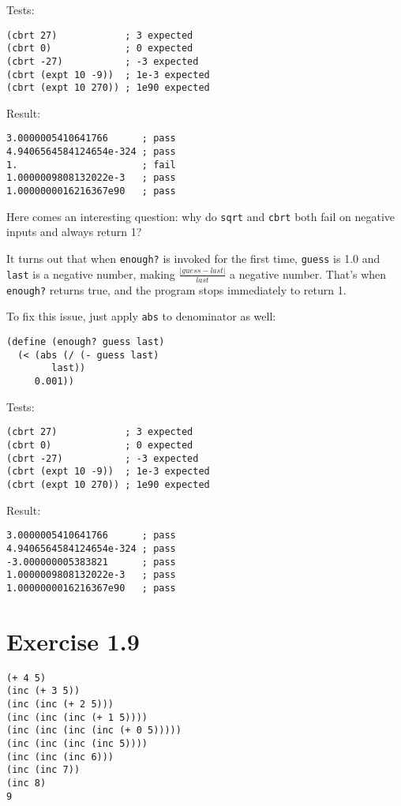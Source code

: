 \documentclass[../main.tex]{subfiles}
\begin{document}
Tests:

\begin{lstlisting}
(cbrt 27)            ; 3 expected
(cbrt 0)             ; 0 expected
(cbrt -27)           ; -3 expected
(cbrt (expt 10 -9))  ; 1e-3 expected
(cbrt (expt 10 270)) ; 1e90 expected
\end{lstlisting}

Result:

\begin{lstlisting}
3.0000005410641766      ; pass
4.9406564584124654e-324 ; pass
1.                      ; fail
1.0000009808132022e-3   ; pass
1.0000000016216367e90   ; pass
\end{lstlisting}

Here comes an interesting question: why do
 \lstinline{sqrt} and \lstinline{cbrt}
 both fail on negative inputs and always
 return 1?

It turns out that when \lstinline{enough?} is invoked
 for the first time, \lstinline{guess} is 1.0 and
 \lstinline{last} is a negative number, making
 $\frac{|guess-last|}{last}$ a negative number. That's
 when \lstinline{enough?} returns true, and the
 program stops immediately to return 1.

To fix this issue, just apply \lstinline{abs} to
 denominator as well:

\begin{lstlisting}
(define (enough? guess last)
  (< (abs (/ (- guess last)
        last))
     0.001))
\end{lstlisting}

Tests:

\begin{lstlisting}
(cbrt 27)            ; 3 expected
(cbrt 0)             ; 0 expected
(cbrt -27)           ; -3 expected
(cbrt (expt 10 -9))  ; 1e-3 expected
(cbrt (expt 10 270)) ; 1e90 expected
\end{lstlisting}

Result:

\begin{lstlisting}
3.0000005410641766      ; pass
4.9406564584124654e-324 ; pass
-3.000000005383821      ; pass
1.0000009808132022e-3   ; pass
1.0000000016216367e90   ; pass
\end{lstlisting}

\section{Exercise 1.9}

\begin{lstlisting}
(+ 4 5)
(inc (+ 3 5))
(inc (inc (+ 2 5)))
(inc (inc (inc (+ 1 5))))
(inc (inc (inc (inc (+ 0 5)))))
(inc (inc (inc (inc 5))))
(inc (inc (inc 6)))
(inc (inc 7))
(inc 8)
9
\end{lstlisting}
\end{document}
